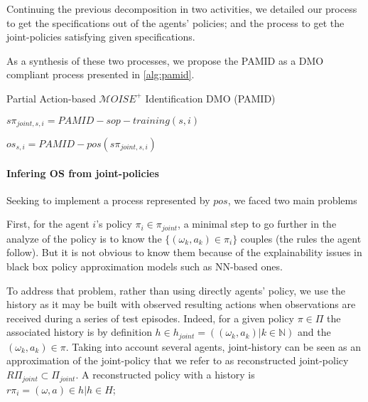 \documentclass[runningheads]{llncs}
\begin{document}
Continuing the previous decomposition in two activities, we detailed our process to get the specifications out of the agents' policies; and the process to get the joint-policies satisfying given specifications.

As a synthesis of these two processes, we propose the PAMID as a DMO compliant process presented in \autoref{alg:pamid}.


\begin{algorithm}[hbt!]
    \caption{Partial Action-based $\mathcal{M}OISE^+$ Identification DMO (PAMID)}\label{alg:pamid}
    

    
    $s\pi_{joint,s,i} = PAMID-sop-training(s,i)$

    $os_{s,i} = PAMID-pos(s\pi_{joint,s,i})$
    
\end{algorithm}

\paragraph{\textbf{Infering OS from joint-policies}}

Seeking to implement a process represented by $pos$, we faced two main problems

First, for the agent $i$'s policy $\pi_{i} \in \pi_{joint}$, a minimal step to go further in the analyze of the policy is to know the $\{(\omega_k, a_k) \in \pi_{i}\}$ couples (the rules the agent follow). But it is not obvious to know them because of the explainability issues in black box policy approximation models such as NN-based ones.

To address that problem, rather than using directly agents' policy, we use the history as it may be built with observed resulting actions when observations are received during a series of test episodes. Indeed, for a given policy $\pi \in \Pi$ the associated history is by definition $h \in h_{joint} = ((\omega_k,a_k) | k \in \mathbb{N})$ and the $(\omega_k,a_k) \in \pi$. Taking into account several agents, joint-history can be seen as an approximation of the joint-policy that we refer to as reconstructed joint-policy $R\Pi_{joint} \subset \Pi_{joint}$. A reconstructed policy with a history is $r\pi_i = {(\omega, a) \in h | h \in H}$;
\end{document}
